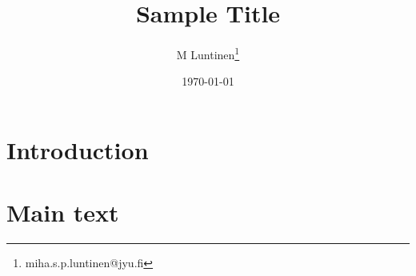 \documentclass{article}
\title{Sample Title}
\author{M Luntinen\thanks{miha.s.p.luntinen@jyu.fi}}
\date{\today}
\begin{document}
\maketitle
    
        \section{Introduction}
        \blindtext

        \blindtext
        \section{Main text}

        \blindtext

        \blindtext
\end{document}
